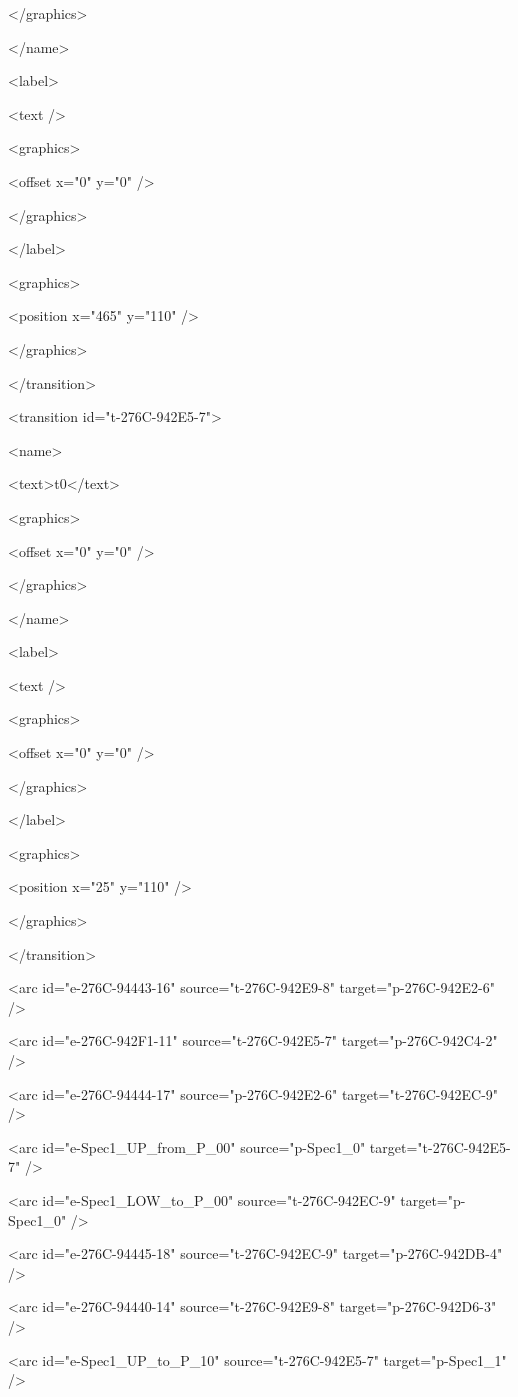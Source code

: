      </graphics>

    </name>

    <label>

     <text />

     <graphics>

      <offset x="0" y="0" />

     </graphics>

    </label>

    <graphics>

     <position x="465" y="110" />

    </graphics>

   </transition>

   <transition id="t-276C-942E5-7">

    <name>

     <text>t0</text>

     <graphics>

      <offset x="0" y="0" />

     </graphics>

    </name>

    <label>

     <text />

     <graphics>

      <offset x="0" y="0" />

     </graphics>

    </label>

    <graphics>

     <position x="25" y="110" />

    </graphics>

   </transition>

   <arc id="e-276C-94443-16" source="t-276C-942E9-8" target="p-276C-942E2-6" />

   <arc id="e-276C-942F1-11" source="t-276C-942E5-7" target="p-276C-942C4-2" />

   <arc id="e-276C-94444-17" source="p-276C-942E2-6" target="t-276C-942EC-9" />

   <arc id="e-Spec1\_UP\_from\_P\_00" source="p-Spec1\_0" target="t-276C-942E5-7" />

   <arc id="e-Spec1\_LOW\_to\_P\_00" source="t-276C-942EC-9" target="p-Spec1\_0" />

   <arc id="e-276C-94445-18" source="t-276C-942EC-9" target="p-276C-942DB-4" />

   <arc id="e-276C-94440-14" source="t-276C-942E9-8" target="p-276C-942D6-3" />

   <arc id="e-Spec1\_UP\_to\_P\_10" source="t-276C-942E5-7" target="p-Spec1\_1" />

